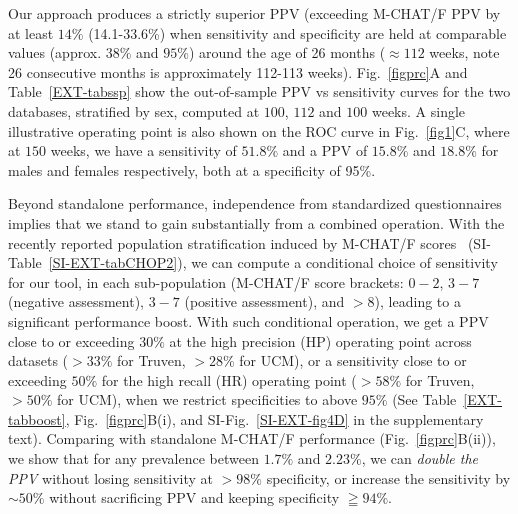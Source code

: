 \documentclass[onecolumn,10pt]{IEEEtran}
\begin{document}
Our approach produces a strictly superior PPV (exceeding M-CHAT/F PPV by at  least $14\%$ (14.1-33.6\%) when sensitivity and specificity are held at comparable values (approx. $38\%$ and $95\%$) around the age of 26 months ($\approx 112$ weeks, note 26 consecutive months is approximately 112-113 weeks). Fig.~\ref{figprc}A and Table~\ref{EXT-tabssp} show  the out-of-sample  PPV vs sensitivity curves   for the two databases, stratified by sex, computed at $100$, $112$ and $100$ weeks. A single illustrative operating point is also shown on the ROC curve in Fig.~\ref{fig1}C, where at $150$ weeks, we have a sensitivity of $51.8\%$ and a PPV of $15.8\%$ and $18.8\%$ for males and females respectively, both at a specificity of 95\%. 

Beyond standalone performance, independence from standardized questionnaires implies that we stand to gain substantially  from a combined operation. With the recently reported population stratification induced by M-CHAT/F scores~\cite{pmid31562252} (SI-Table~\ref{SI-EXT-tabCHOP2}), we can compute a conditional choice of sensitivity  for our tool, in each sub-population (M-CHAT/F score brackets: $0-2$, $3-7$ (negative assessment), $3-7$ (positive assessment), and $>8$), leading to a  significant performance boost. With such conditional operation, we get a PPV close to or exceeding $30\%$ at the high precision (HP) operating point across datasets ($>33\%$ for Truven, $>28\%$ for UCM), or a sensitivity close to or exceeding $50\%$ for the high recall (HR) operating point ($>58\%$ for  Truven, $>50\%$ for UCM), when we restrict specificities to above $95\%$ (See Table~\ref{EXT-tabboost}, Fig.~\ref{figprc}B(i), and SI-Fig.~\ref{SI-EXT-fig4D}  in the supplementary text). Comparing   with standalone M-CHAT/F performance (Fig.~\ref{figprc}B(ii)), we show that for any prevalence between $1.7\%$ and $2.23\%$, we can   \textit{double the PPV} without losing sensitivity at $>98\%$ specificity, or increase the sensitivity by $\sim 50\%$ without sacrificing PPV and  keeping specificity $\geqq 94\%$.%
\end{document}

